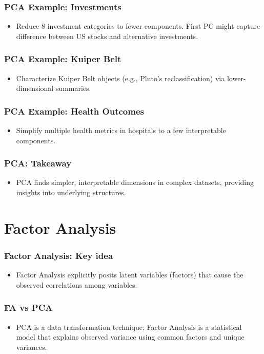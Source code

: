 \documentclass{beamer}
\begin{document}
\begin{frame}
    \frametitle{PCA Example: Investments}
    \begin{itemize}
        \item Reduce 8 investment categories to fewer components. First PC might capture difference between US stocks and alternative investments.
    \end{itemize}
\end{frame}

\begin{frame}
    \frametitle{PCA Example: Kuiper Belt}
    \begin{itemize}
        \item Characterize Kuiper Belt objects (e.g., Pluto's reclassification) via lower-dimensional summaries.
    \end{itemize}
\end{frame}

\begin{frame}
    \frametitle{PCA Example: Health Outcomes}
    \begin{itemize}
        \item Simplify multiple health metrics in hospitals to a few interpretable components.
    \end{itemize}
\end{frame}

\begin{frame}
    \frametitle{PCA: Takeaway}
    \begin{itemize}
        \item PCA finds simpler, interpretable dimensions in complex datasets, providing insights into underlying structures.
    \end{itemize}
\end{frame}

\section{Factor Analysis}

\begin{frame}
    \frametitle{Factor Analysis: Key idea}
    \begin{itemize}
        \item Factor Analysis explicitly posits \alert{latent variables} (factors) that cause the observed correlations among variables.
    \end{itemize}
\end{frame}

\begin{frame}
    \frametitle{FA vs PCA}
    \begin{itemize}
        \item PCA is a data transformation technique; Factor Analysis is a statistical model that explains observed variance using common factors and unique variances.
    \end{itemize}
\end{frame}
\end{document}
